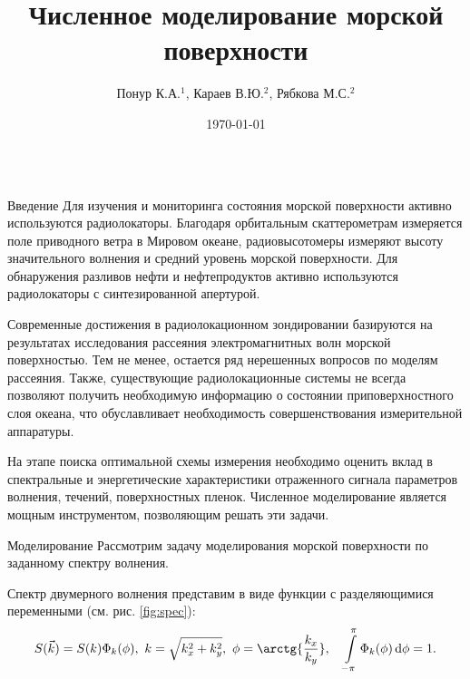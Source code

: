 
\title{Численное моделирование морской поверхности}
\author{Понур К.А.$^{1}$, Караев В.Ю.$^2$, Рябкова М.С.$^2$}
\date{\today}
\newcommand{\tM}{\widetilde{M}}
\usepackage{mathtools}

  \begin{frame}[t]{} 
    \begin{columns}[t]
      \begin{column}{.48\linewidth}
        \begin{block}{Введение}
            Для изучения и мониторинга состояния морской поверхности активно используются радиолокаторы. 
            Благодаря орбитальным скаттерометрам измеряется поле приводного ветра в Мировом океане, радиовысотомеры измеряют высоту значительного волнения и средний уровень
            морской поверхности. Для обнаружения разливов нефти и нефтепродуктов активно используются радиолокаторы с синтезированной апертурой.

            Современные достижения в радиолокационном зондировании базируются на результатах исследования рассеяния электромагнитных волн морской поверхностью. Тем не менее, остается ряд нерешенных 
            вопросов по моделям рассеяния. Также, существующие радиолокационные системы не всегда позволяют получить необходимую информацию о состоянии приповерхностного слоя океана, что обуславливает необходимость совершенствования измерительной аппаратуры. 

            На этапе поиска оптимальной схемы измерения необходимо оценить вклад в спектральные и энергетические характеристики отраженного сигнала параметров волнения, течений, поверхностных пленок. Численное моделирование является мощным инструментом, позволяющим решать эти задачи.
        \end{block}
        \begin{block}{Моделирование}
            Рассмотрим задачу моделирования морской поверхности по заданному спектру волнения.

            Спектр двумерного волнения представим в виде функции с разделяющимися переменными (см. рис. \ref{fig:spec}):
        \begin{equation}
            \label{eq:}
            S(\vec k) = S(k) \Phi_k(\phi), ~ k = \sqrt{k_x^2+k_y^2},~ \phi=\arctg{\frac{k_x}{k_y}},\quad \int\limits_{-\pi}^{\pi} \Phi_k(\phi) \dd{\phi} = 1.
        \end{equation}
        

\end{block}
\end{column}
\end{columns}
\end{frame}
